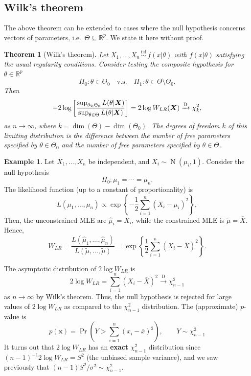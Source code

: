 \documentclass[
]{book}
\newcommand{\bx}{{\boldsymbol x}}
\newcommand{\bX}{{\boldsymbol X}}
\DeclareMathOperator{\N}{N}
\newcommand{\iid}{\,\overset{\text{iid}}{\sim}\,}
\newcommand{\bbR}{\mathbb{R}}
\newcommand{\half}[1][1]{\frac{#1}{2}}  %
\newtheorem{theorem}{Theorem}[chapter]
\theoremstyle{definition}
\theoremstyle{definition}
\newtheorem{example}{Example}[chapter]
\theoremstyle{definition}
\theoremstyle{definition}
\theoremstyle{remark}
\begin{document}
\hypertarget{wilks-theorem}{%
\subsection{Wilk's theorem}\label{wilks-theorem}}

The above theorem can be extended to cases where the null hypothesis concerns vectors of parameters, i.e.~\(\Theta\subseteq \bbR^p\). We state it here without proof.

\begin{theorem}[Wilk's theorem]
Let $X_1,\dots,X_n\iid f(x|\theta)$ with $f(x|\theta)$ satisfying the usual regularity conditions. Consider testing the composite hypothesis for $\theta\in\bbR^p$
$$H_0: \theta \in \Theta_0 \hspace{1em}\text{v.s.}\hspace{1em} H_1: \theta \in \Theta\setminus\Theta_0.$$
Then
$$
-2\log \left[ \frac{\sup_{\theta\in\Theta_0}L(\theta|\bX)}{\sup_{\theta\in\Theta}  L(\theta|\bX)} \right]= 2\log W_{LR}(\bX)  \xrightarrow{\text{D}} \chi^2_k,\vspace{.5em}
$$
as $n\to\infty$, where $k=\dim(\Theta)-\dim(\Theta_0)$. The degrees of freedom $k$ of this limiting distribution is the difference between the number of free parameters specified by $\theta\in\Theta_0$ and the number of free parameters specified by $\theta\in\Theta$.
\end{theorem}

\begin{example}
Let \(X_1,\dots,X_n\) be independent, and \(X_i\sim\N(\mu_i,1)\). Consider
the null hypothesis
\[H_0: \mu_1 = \cdots = \mu_n.\]
The likelihood function (up to a constant of proportionality) is
\[L(\mu_1,\dots,\mu_n) \propto \exp\left\{-\half \sum_{i=1}^n (X_i-\mu_i)^2 \right\},\]
Then, the unconstrained MLE are \(\hat\mu_i=X_i\), while the constrained MLE is
\(\tilde\mu=\bar X\).
Hence,
\[W_{LR} = \frac{L(\hat\mu_1,\dots,\hat\mu_n)}{L(\tilde\mu,\dots,\tilde\mu)} = \exp\left\{\half \sum_{i=1}^n (X_i-\bar X)^2 \right\}.\]

The asymptotic distribution of \(2\log W_{LR}\) is
\[2\log W_{LR} = \sum_{i=1}^n (X_i-\bar X)^2  \xrightarrow{\text{D}} \chi^2_{n-1}\]
as \(n\to\infty\) by Wilk's theorem.
Thus, the null hypothesis is rejected for large values of \(2\log W_{LR}\) as compared to the \(\chi^2_{n-1}\) distribution.
The (approximate) \(p\)-value is
\[
p(\bx) = \Pr\left(Y > \sum_{i=1}^n (x_i-\bar x)^2 \right), \hspace{2em} Y\sim\chi^2_{n-1}
\]
It turns out that \(2\log W_{LR}\) has an \textbf{exact} \(\chi^2_{n-1}\) distribution since
\((n-1)^{-1}2\log W_{LR}=S^2\) (the unbiased sample variance), and we saw previously that
\((n-1)S^2/\sigma^2 \sim\chi^2_{n-1}\).
\end{example}
\end{document}
